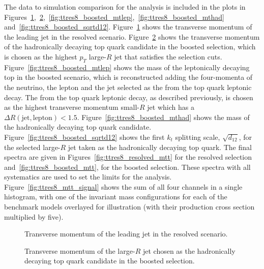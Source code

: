 The data to simulation comparison for the analysis is included in the plots in Figures~\ref{fig:ttres8_resolved_leadingpt},~\ref{fig:ttres8_boosted_pthad},~\ref{fig:ttres8_boosted_mtlep},~\ref{fig:ttres8_boosted_mthad} and~\ref{fig:ttres8_boosted_sqrtd12}.
Figure~\ref{fig:ttres8_resolved_leadingpt} shows the transverse momentum of the leading jet in the resolved scenario.
Figure~\ref{fig:ttres8_boosted_pthad} shows the transverse momentum of the hadronically decaying top quark candidate in the boosted selection,
which is chosen as the highest $p_T$ large-$R$ jet that satisfies the selection cuts.
Figure~\ref{fig:ttres8_boosted_mtlep} shows the mass of the leptonically decaying top in the boosted scenario, which is reconstructed adding the four-momenta of 
the neutrino, the lepton and the jet selected as the \bjet from the top quark leptonic decay. The \bjet from the top quark leptonic decay, as described previously,
is chosen as the highest transverse momentum small-$R$ jet which has a $\Delta R (\textrm{jet}, \textrm{lepton}) < 1.5$.
Figure~\ref{fig:ttres8_boosted_mthad} shows the mass of the hadronically decaying top quark candidate.
Figure~\ref{fig:ttres8_boosted_sqrtd12} shows the first $k_t$ splitting scale, $\sqrt{d_{12}}$, for the selected large-$R$ jet taken as the hadronically decaying top quark.
The final spectra are given in Figures~\ref{fig:ttres8_resolved_mtt} for the resolved selection and~\ref{fig:ttres8_boosted_mtt}, for the boosted selection. These
spectra with all systematics are used to set the limits for the analysis. Figure~\ref{fig:ttres8_mtt_signal} shows the sum of all four channels in a single histogram,
with one of the invariant mass configurations for each of the benchmark models overlayed for illustration (with their production cross section multiplied by five).

\begin{figure}
\centering
{}
\caption{Transverse momentum of the leading jet in the resolved scenario.}
\label{fig:ttres8_resolved_leadingpt}
\end{figure}

\begin{figure}
\centering
{}
\caption{Transverse momentum of the large-$R$ jet chosen as the hadronically decaying top quark candidate in the boosted selection.}
\label{fig:ttres8_boosted_pthad}
\end{figure}


